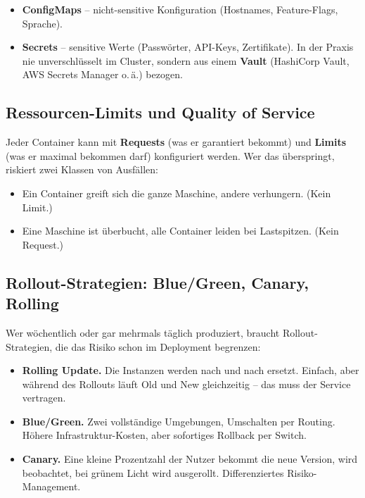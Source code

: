 \documentclass[11pt,a4paper,oneside]{article}
\newcommand{\fachbegriff}[1]{\textbf{#1}}
\begin{document}
\begin{itemize}
  \item \textbf{ConfigMaps} -- nicht-sensitive Konfiguration (Hostnames, Feature-Flags, Sprache).
  \item \textbf{Secrets} -- sensitive Werte (Passwörter, API-Keys, Zertifikate). In der Praxis nie unverschlüsselt im Cluster, sondern aus einem \fachbegriff{Vault} (HashiCorp Vault, AWS Secrets Manager o.\,ä.) bezogen.
\end{itemize}

\subsection{Ressourcen-Limits und Quality of Service}

Jeder Container kann mit \fachbegriff{Requests} (was er garantiert bekommt) und \fachbegriff{Limits} (was er maximal bekommen darf) konfiguriert werden. Wer das überspringt, riskiert zwei Klassen von Ausfällen:

\begin{itemize}
  \item Ein Container greift sich die ganze Maschine, andere verhungern. (Kein Limit.)
  \item Eine Maschine ist überbucht, alle Container leiden bei Lastspitzen. (Kein Request.)
\end{itemize}

\subsection{Rollout-Strategien: Blue/Green, Canary, Rolling}

Wer wöchentlich oder gar mehrmals täglich produziert, braucht Rollout-Strategien, die das Risiko schon im Deployment begrenzen:

\begin{itemize}
  \item \fachbegriff{Rolling Update.} Die Instanzen werden nach und nach ersetzt. Einfach, aber während des Rollouts läuft Old und New gleichzeitig -- das muss der Service vertragen.
  \item \fachbegriff{Blue/Green.} Zwei vollständige Umgebungen, Umschalten per Routing. Höhere Infrastruktur-Kosten, aber sofortiges Rollback per Switch.
  \item \fachbegriff{Canary.} Eine kleine Prozentzahl der Nutzer bekommt die neue Version, wird beobachtet, bei grünem Licht wird ausgerollt. Differenziertes Risiko-Management.
\end{itemize}
\end{document}
